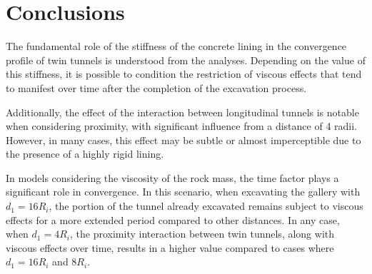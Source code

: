 \documentclass[a4paper,fleqn]{cas-sc}
\begin{document}





\section{Conclusions}\label{}

The fundamental role of the stiffness of the concrete lining in the convergence profile of twin tunnels is understood from the analyses. Depending on the value of this stiffness, it is possible to condition the restriction of viscous effects that tend to manifest over time after the completion of the excavation process.

Additionally, the effect of the interaction between longitudinal tunnels is notable when considering proximity, with significant influence from a distance of 4 radii. However, in many cases, this effect may be subtle or almost imperceptible due to the presence of a highly rigid lining.

In models considering the viscosity of the rock mass, the time factor plays a significant role in convergence. In this scenario, when excavating the gallery with $d_1 = 16R_i$, the portion of the tunnel already excavated remains subject to viscous effects for a more extended period compared to other distances. In any case, when $d_1 = 4R_i$, the proximity interaction between twin tunnels, along with viscous effects over time, results in a higher value compared to cases where $d_1 = 16R_i$ and $8R_i$.
\end{document}
